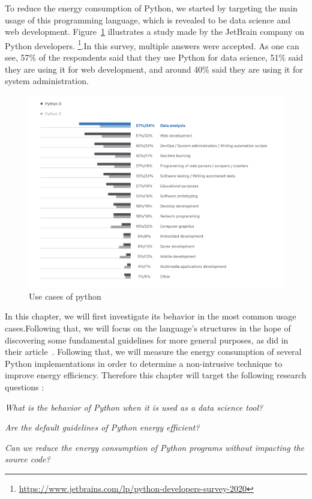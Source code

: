 To reduce the energy consumption of Python, we started by targeting the main usage of this programming language, which is revealed to be data science and web development. Figure~\ref{fig:usecase} illustrates a study made by the JetBrain company on Python developers. \footnote{\url{https://www.jetbrains.com/lp/python-developers-survey-2020}}.In this survey, multiple answers were accepted. As one can see, 57\% of the respondents said that they use Python for data science, 51\% said they are using it for web development, and around 40\% said they are using it for system administration.
\begin{figure}[hbt]
    \centering
    \includegraphics[width=\linewidth]{imgs/python_use_cases}
    \caption{Use cases of python }
    \label{fig:usecase}
\end{figure}

In this chapter, we will first investigate its behavior in the most common usage cases.Following that, we will focus on the language's structures in the hope of discovering some fundamental guidelines for more general purposes, as \citeauthor{hasan_energy_2016-1} did in their article~\cite{hasan_energy_2016-1}.
Following that, we will measure the energy consumption of several Python implementations in order to determine a non-intrusive technique to improve energy efficiency.
Therefore this chapter will target the following research questions :
\begin{compactenum}[\indent\bf RQ\,1:]
    \item \emph{What is the behavior of Python when it is used as a data science tool?}
    \item \emph{Are the default guidelines of Python energy efficient?}
    \item \emph{Can we reduce the energy consumption of Python programs without impacting the source code?}
\end{compactenum}

